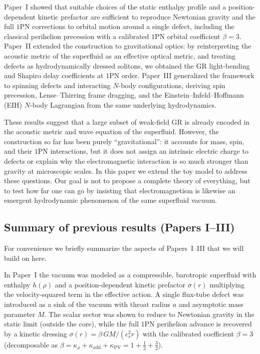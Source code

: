 \documentclass[11pt]{article}
\begin{document}
Paper~I \cite{Norris:2025Orbits} showed that suitable choices of the static enthalpy profile and a position-dependent kinetic prefactor are sufficient to reproduce Newtonian gravity and the full $1$PN corrections to orbital motion around a single defect, including the classical perihelion precession with a calibrated $1$PN orbital coefficient $\beta = 3$.  Paper~II \cite{Norris:Paper2} extended the construction to gravitational optics: by reinterpreting the acoustic metric of the superfluid as an effective optical metric, and treating defects as hydrodynamically dressed solitons, we obtained the GR light-bending and Shapiro delay coefficients at $1$PN order.  Paper~III \cite{Norris:Paper3} generalized the framework to spinning defects and interacting $N$-body configurations, deriving spin precession, Lense--Thirring frame dragging, and the Einstein--Infeld--Hoffmann (EIH) $N$-body Lagrangian from the same underlying hydrodynamics.

These results suggest that a large subset of weak-field GR is already encoded in the acoustic metric and wave equation of the superfluid.  However, the construction so far has been purely ``gravitational'': it accounts for mass, spin, and their $1$PN interactions, but it does not assign an intrinsic electric charge to defects or explain why the electromagnetic interaction is so much stronger than gravity at microscopic scales.  In this paper we extend the toy model to address these questions.  Our goal is not to propose a complete theory of everything, but to test how far one can go by insisting that electromagnetism is likewise an emergent hydrodynamic phenomenon of the same superfluid vacuum.

\subsection{Summary of previous results (Papers I--III)}

For convenience we briefly summarize the aspects of Papers~I--III that we will build on here.

In Paper~I \cite{Norris:2025Orbits} the vacuum was modeled as a compressible, barotropic superfluid with enthalpy $h(\rho)$ and a position-dependent kinetic prefactor $\sigma(r)$ multiplying the velocity-squared term in the effective action.  A single flux-tube defect was introduced as a sink of the vacuum with throat radius $a$ and asymptotic mass parameter $M$.  The scalar sector was shown to reduce to Newtonian gravity in the static limit (outside the core), while the full $1$PN perihelion advance is recovered by a kinetic dressing $\sigma(r)=\beta\,GM/(c_s^2 r)$ with the calibrated coefficient $\beta=3$ (decomposable as $\beta=\kappa_\rho+\kappa_{\mathrm{add}}+\kappa_{\mathrm{PV}}=1+\tfrac12+\tfrac32$).
\end{document}
